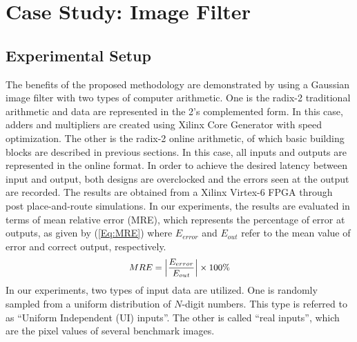 \documentclass{acm_proc_article-sp}
\begin{document}
\section{Case Study: Image Filter}\label{Sec:CaseStudy}
\subsection{Experimental Setup}
The benefits of the proposed methodology are demonstrated by using a Gaussian image filter with two types of computer arithmetic. One is the radix-2 traditional arithmetic and data are represented in the 2's complemented form. In this case, adders and multipliers are created using Xilinx Core Generator \cite{Virtex6} with speed optimization. The other is the radix-2 online arithmetic, of which basic building blocks are described in previous sections. In this case, all inputs and outputs are represented in the online format. In order to achieve the desired latency between input and output, both designs are overclocked and the errors seen at the output are recorded. The results are obtained from a Xilinx Virtex-6 FPGA through post place-and-route simulations. In our experiments, the results are evaluated in terms of mean relative error (MRE), which represents the percentage of error at outputs, as given by (\ref{Eq:MRE}) where $E_{error}$ and $E_{out}$ refer to the mean value of error and correct output, respectively.
%
\begin{eqnarray}\label{Eq:MRE}
\footnotesize
  MRE=\left|\frac{E_{error}}{E_{out}}\right|\times100\%
\normalsize
\end{eqnarray}
%
In our experiments, two types of input data are utilized. One is randomly sampled from a uniform distribution of $N$-digit numbers. This type is referred to as ``Uniform Independent (UI) inputs''. The other is called ``real inputs'', which are the pixel values of several benchmark images.
\end{document}
